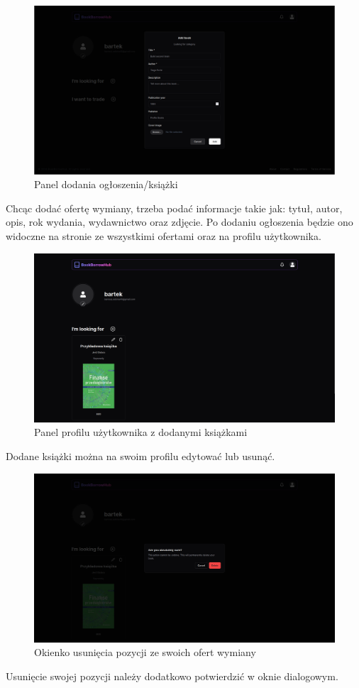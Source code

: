 \documentclass[12pt]{article}
\begin{document}
\newpage
\begin{figure}[h!]
	\centering
	\includegraphics[width=17.5cm]{figures/Obraz17.png}
	\caption{Panel dodania ogłoszenia/książki}
\end{figure}
Chcąc dodać ofertę wymiany, 
trzeba podać informacje takie jak: tytuł, autor, opis, 
rok wydania, wydawnictwo oraz zdjęcie. 
Po dodaniu ogłoszenia będzie ono widoczne 
na stronie ze wszystkimi ofertami oraz na profilu użytkownika.

\newpage
\begin{figure}[h!]
	\centering
	\includegraphics[width=17.5cm]{figures/Obraz18.png}
	\caption{Panel profilu użytkownika z dodanymi książkami}
\end{figure}
Dodane książki można na swoim profilu edytować lub usunąć.

\newpage
\begin{figure}[h!]
	\centering
	\includegraphics[width=17.5cm]{figures/Obraz19.png}
	\caption{Okienko usunięcia pozycji ze swoich ofert wymiany}
\end{figure}
Usunięcie swojej pozycji należy dodatkowo potwierdzić w oknie dialogowym.
\end{document}
